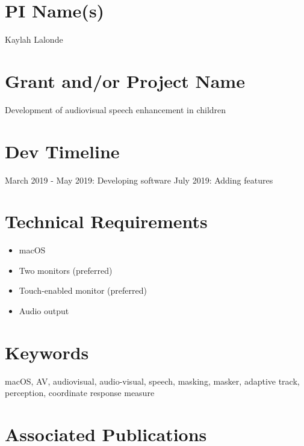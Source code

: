 \documentclass[11pt,pdftex,letterpaper]{article}
\begin{document}
\section{PI Name(s)}
Kaylah Lalonde

\section{Grant and/or Project Name}
Development of audiovisual speech enhancement in children

\section{Dev Timeline}
March 2019 - May 2019: Developing software
July 2019: Adding features

\section{Technical Requirements}
\begin{itemize}
\item macOS
\item Two monitors (preferred)
\item Touch-enabled monitor (preferred)
\item Audio output
\end{itemize}

\section{Keywords}
macOS, AV, audiovisual, audio-visual, speech, masking, masker, adaptive track, perception, coordinate response measure

\section{Associated Publications}
\end{document}
